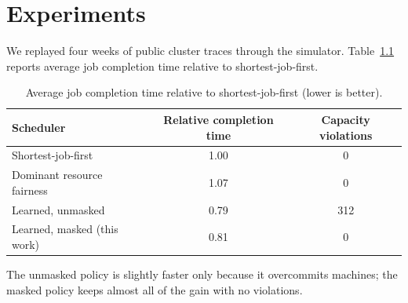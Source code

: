 \chapter{Experiments}
\label{ch:experiments}

We replayed four weeks of public cluster traces through the simulator.
Table~\ref{tab:jct} reports average job completion time relative to shortest-job-first.

\begin{table}[htbp]
  \centering
  \caption{Average job completion time relative to shortest-job-first (lower is better).}
  \label{tab:jct}
  \begin{tabular}{lcc}
    \toprule
    Scheduler & Relative completion time & Capacity violations \\
    \midrule
    Shortest-job-first           & 1.00 & 0 \\
    Dominant resource fairness   & 1.07 & 0 \\
    Learned, unmasked            & 0.79 & 312 \\
    Learned, masked (this work)  & 0.81 & 0 \\
    \bottomrule
  \end{tabular}
\end{table}

The unmasked policy is slightly faster only because it overcommits machines; the masked
policy keeps almost all of the gain with no violations.
